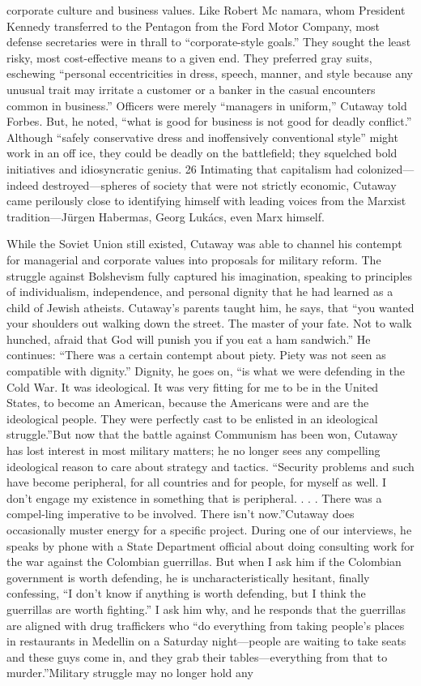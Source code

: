 corporate culture and business values. Like Robert Mc namara, whom President Kennedy transferred to the Pentagon from the Ford Motor Company, most defense secretaries were in thrall to “corporate-style goals.” They sought the least risky, most cost-effective means to a given end. They preferred gray suits, eschewing “personal eccentricities in dress, speech, manner, and style because any unusual trait may irritate a customer or a banker in the casual encounters common in business.” Officers were merely “managers in uniform,” Cutaway told Forbes. But, he noted, “what is good for business is not good for deadly conflict.” Although “safely conservative dress and inoffensively conventional style” might work in an off ice, they could be deadly on the battlefield; they squelched bold initiatives and idiosyncratic genius. {\color{blue} 26 } Intimating that capitalism had colonized—indeed destroyed—spheres of society that were not strictly economic, Cutaway came perilously close to identifying himself with leading voices from the Marxist tradition—Jürgen Habermas, Georg Lukács, even Marx himself.{\par} While the Soviet Union still existed, Cutaway was able to channel his contempt for managerial and corporate values into proposals for military reform. The struggle against Bolshevism fully captured his imagination, speaking to principles of individualism, independence, and personal dignity that he had learned as a child of Jewish atheists. Cutaway’s parents taught him, he says, that “you wanted your shoulders out walking down the street. The master of your fate. Not to walk hunched, afraid that God will punish you if you eat a ham sandwich.” He continues: “There was a certain contempt about piety. Piety was not seen as compatible with dignity.” Dignity, he goes on, “is what we were defending in the Cold War. It was ideological. It was very fitting for me to be in the United States, to become an American, because the Americans were and are the ideological people. They were perfectly cast to be enlisted in an ideological struggle.”But now that the battle against Communism has been won, Cutaway has lost interest in most military matters; he no longer sees any compelling ideological reason to care about strategy and tactics. “Security problems and such have become peripheral, for all countries and for people, for myself as well. I don’t engage my existence in something that is peripheral. . . . There was a compel-ling imperative to be involved. There isn’t now.”Cutaway does occasionally muster energy for a specific project. During one of our interviews, he speaks by phone with a State Department official about doing consulting work for the war against the Colombian guerrillas. But when I ask him if the Colombian government is worth defending, he is uncharacteristically hesitant, finally confessing, “I don’t know if anything is worth defending, but I think the guerrillas are worth fighting.” I ask him why, and he responds that the guerrillas are aligned with drug traffickers who “do everything from taking people’s places in restaurants in Medellin on a Saturday night—people are waiting to take seats and these guys come in, and they grab their tables—everything from that to murder.”Military struggle may no longer hold any 